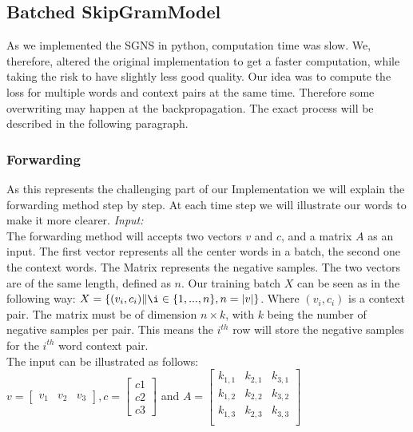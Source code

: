 \subsection{Batched SkipGramModel}\label{ssec:b_SGM}
As we implemented the SGNS in python, computation time was slow. We, therefore, altered the original implementation to get a faster computation, while taking the risk to have slightly less good quality. Our idea was to compute the loss for multiple words and context pairs at the same time. Therefore some overwriting may happen at the backpropagation. The exact process will be described in the following paragraph. 
\subsubsection{Forwarding}
As this represents the challenging part of our Implementation we will explain the forwarding method step by step. At each time step we will illustrate our words to make it more clearer. 
\textit{Input:}\\
The forwarding method will accepts two vectors $v$ and $c$, and a matrix $A$ as an input. The first vector represents all the center words in a batch, the second one the context words. The Matrix represents the negative samples. The two vectors are of the same length, defined as $n$. Our training batch $X$ can be seen as in the following way:  $X = \{(v_i, c_i)\|\i \in \{1, ..., n\}, n = |v| \}$. Where $(v_i,c_i)$ is a context pair. The matrix must be of dimension $n \times k$, with $k$ being the number of negative samples per pair. This means the $i^{th}$ row will store the negative samples for the $i^{th}$ word context pair.\\
The input can be illustrated as follows: \\

 $v = \begin{bmatrix}
v_1 & v_2 & v_3
\end{bmatrix}, c = \begin{bmatrix}
c1\\
c2\\
c3\end{bmatrix}$ and $A = 
\begin{bmatrix}
k_{1,1} & k_{2,1} & k_{3,1}\\
k_{1,2} & k_{2,2} & k_{3,2}\\
k_{1,3} & k_{2,3} & k_{3,3}\\
\end{bmatrix}$\\

